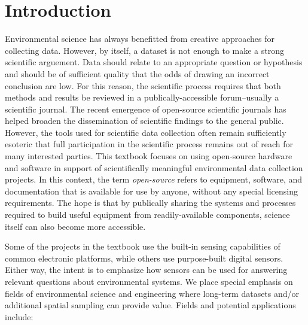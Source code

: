 
\setchapterpreamble[u]{\margintoc}
\chapter{\color{gray} Introduction \color{black}}

Environmental science has always benefitted from creative approaches for collecting data. However, by itself, a dataset is not enough to make a strong scientific arguement. Data should relate to an appropriate question or hypothesis and should be of sufficient quality that the odds of drawing an incorrect conclusion are low.  For this reason, the scientific process requires that both methods and results be reviewed in a publically-accessible forum--usually a scientific journal. The recent emergence of open-source scientific journals has helped broaden the dissemination of scientific findings to the general public. However, the tools used for scientific data collection often remain sufficiently esoteric that full participation in the scientific process remains out of reach for many interested parties. This textbook focuses on using open-source hardware and software in support of scientifically meaningful environmental data collection projects.  In this context, the term \emph{open-source} refers to equipment, software, and documentation that is available for use by anyone, without any special licensing requirements. The hope is that by publically sharing the systems and processes required to build useful equipment from readily-available components, science itself can also become more accessible.

Some of the projects in the textbook use the built-in sensing capabilities of common electronic platforms, while others use purpose-built digital sensors.  Either way, the intent is to emphasize how sensors can be used for answering relevant questions about environmental systems. We place special emphasis on fields of environmental science and engineering where long-term datasets and/or additional spatial sampling can provide value. Fields and potential applications include:

